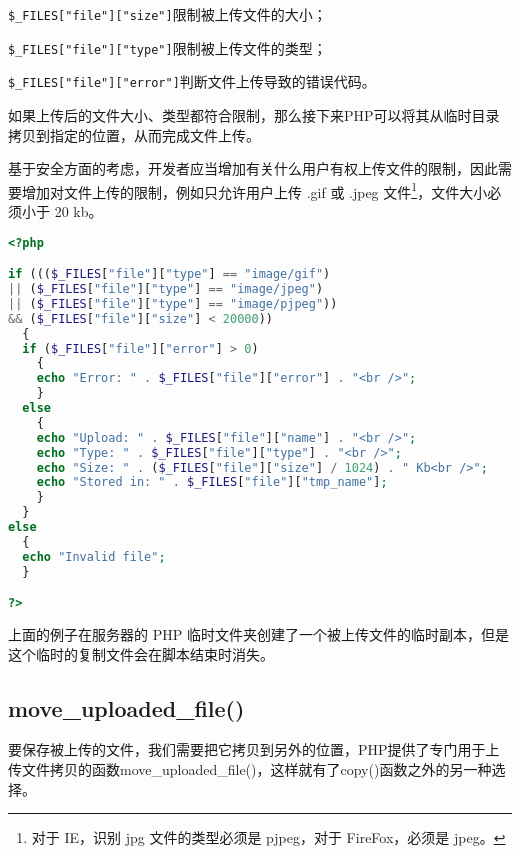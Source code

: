 \begin{compactitem}
\item \texttt{\$\_FILES["file"]["size"]}限制被上传文件的大小；
\item \texttt{\$\_FILES["file"]["type"]}限制被上传文件的类型；
\item \texttt{\$\_FILES["file"]["error"]}判断文件上传导致的错误代码。
\end{compactitem}

如果上传后的文件大小、类型都符合限制，那么接下来PHP可以将其从临时目录拷贝到指定的位置，从而完成文件上传。

基于安全方面的考虑，开发者应当增加有关什么用户有权上传文件的限制，因此需要增加对文件上传的限制，例如只允许用户上传 .gif 或 .jpeg 文件\footnote{对于 IE，识别 jpg 文件的类型必须是 pjpeg，对于 FireFox，必须是 jpeg。}，文件大小必须小于 20 kb。

\begin{lstlisting}[language=PHP]
<?php

if ((($_FILES["file"]["type"] == "image/gif")
|| ($_FILES["file"]["type"] == "image/jpeg")
|| ($_FILES["file"]["type"] == "image/pjpeg"))
&& ($_FILES["file"]["size"] < 20000))
  {
  if ($_FILES["file"]["error"] > 0)
    {
    echo "Error: " . $_FILES["file"]["error"] . "<br />";
    }
  else
    {
    echo "Upload: " . $_FILES["file"]["name"] . "<br />";
    echo "Type: " . $_FILES["file"]["type"] . "<br />";
    echo "Size: " . ($_FILES["file"]["size"] / 1024) . " Kb<br />";
    echo "Stored in: " . $_FILES["file"]["tmp_name"];
    }
  }
else
  {
  echo "Invalid file";
  }

?>
\end{lstlisting}

上面的例子在服务器的 PHP 临时文件夹创建了一个被上传文件的临时副本，但是这个临时的复制文件会在脚本结束时消失。


\subsection{move\_uploaded\_file()}


要保存被上传的文件，我们需要把它拷贝到另外的位置，PHP提供了专门用于上传文件拷贝的函数move\_uploaded\_file()，这样就有了copy()函数之外的另一种选择。

